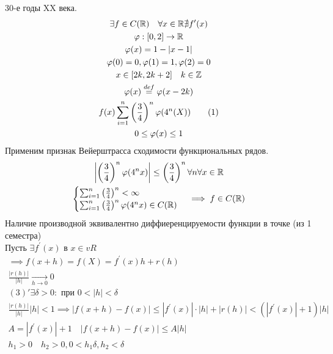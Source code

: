 \documentclass[main]{subfiles}
\begin{document}
\begin{example}
     30-е годы XX века.
     \begin{gather*}
          \exists f \in C(\mathbb{R}) \quad \forall x \in \mathbb{R} \nexists f^\prime(x) \\
          \varphi: [0,2] \rightarrow \mathbb{R} \\
          \varphi(x) = 1 - |x-1| \\
          \varphi(0) = 0, \varphi(1) = 1, \varphi(2) = 0 \\
          x \in [2k, 2k+2] \quad k \in \mathbb{Z} \\
          \varphi(x) \stackrel{def}{=} \varphi(x-2k) \\
          f(x) \sum^n_{i=1} \left( \frac{3}{4} \right)^n \varphi(4^n(X)) \tag{1} \\
          0 \leq \varphi(x) \leq 1 \\
     \end{gather*}
          Применим признак Вейерштрасса сходимости функциональных рядов.
          \begin{gather*}
          \left | \left(\frac{3}{4} \right)^n \varphi(4^nx) \right | \leq \left(\frac{3}{4} \right) ^n \forall n \forall x \in \mathbb{R} \\
          \begin{cases}
          \sum^n_{i=1} \left( \frac{3}{4} \right)^n < \infty \\
          \sum^n_{i=1} \left( \frac{3}{4} \right)^n \varphi(4^nx) \in C(\mathbb{R})
          \end{cases}  \implies f \in C(\mathbb{R}) \\
     \end{gather*}
  Наличие производной эквивалентно диффиеренцируемости функции в точке 
  (из 1 семестра) \\
     Пусть $\exists f^\prime(x) \text{ в } x \in vR$
     \begin{gather*}
          \implies f(x + h) = f(X) = f^\prime(x)h + r(h) \tag{2} \\
          \frac{|r(h)|}{|h|} \underset{h \to 0}{\rightarrow} 0 \tag{3} \\
          (3) \prime \exists \delta > 0  : \text{ при } 0 < |h| < \delta \\
          \frac{|r(h)|}{|h|}{|h|} < 1 \implies |f(x+h) -f(x)| \leq |f^\prime(x)| \cdot |h| +
          |r(h)| < (|f^\prime(x)| + 1)|h| \tag{4} \\
          A = |f^\prime(x)| + 1 \quad |f(x+h) - f(x)| \leq A|h| \tag{4\prime} \\
          h_1 > 0 \quad h_2 > 0, 0 < h_1 \delta, h_2 < \delta \end{gather*}

\end{example}
\end{document}
